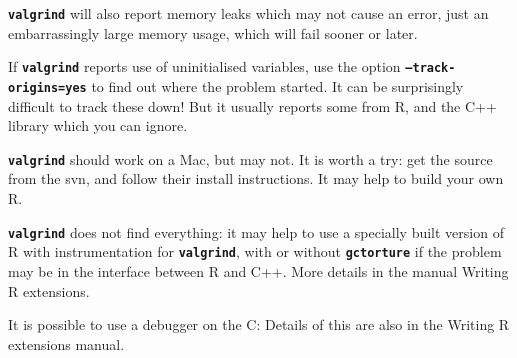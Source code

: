 \documentclass[12pt, a4paper]{article}
\renewcommand{\=}{\,=\,}
\newcommand{\+}{\,+\,}
\newcommand{\sfn}[1]{\textbf{\texttt{#1}}}
\begin{document}
\sfn{valgrind} will also report memory leaks which may not cause an error, just
an embarrassingly large memory usage, which will fail sooner or later.

If \sfn{valgrind} reports use of uninitialised variables, use the option
\sfn{--track-origins=yes} to find out where the problem started. It can be
surprisingly difficult to track these down! But it usually reports some from R,
and the C++ library which you can ignore.

\sfn{valgrind} should work on a Mac, but may not. It is worth a try: get the
source from the svn, and follow their install instructions. It may help to build
your own R.

\sfn{valgrind} does not find everything: it may help to use a specially built
version of R with instrumentation for \sfn{valgrind}, with or without
\sfn{gctorture} if the problem may be in the interface between R and C++. More
details in the manual Writing R extensions.

It is possible to use a debugger on the C: Details of
this are also in the Writing R extensions manual.
\end{document}
